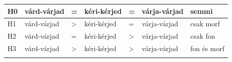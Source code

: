 \begin{frame}
{\def\LTcaptype{none} %
\begin{longtable}[]{@{}
  >{\raggedright\arraybackslash}p{}
  >{\raggedright\arraybackslash}p{}
  >{\raggedright\arraybackslash}p{}
  >{\raggedright\arraybackslash}p{}
  >{\raggedright\arraybackslash}p{}
  >{\raggedright\arraybackslash}p{}
  >{\raggedright\arraybackslash}p{}@{}}
\toprule\noalign{}
\begin{minipage}[b]{\linewidth}\raggedright
H0
\end{minipage} & \begin{minipage}[b]{\linewidth}\raggedright
várd-várjad
\end{minipage} & \begin{minipage}[b]{\linewidth}\raggedright
=
\end{minipage} & \begin{minipage}[b]{\linewidth}\raggedright
kéri-kérjed
\end{minipage} & \begin{minipage}[b]{\linewidth}\raggedright
=
\end{minipage} & \begin{minipage}[b]{\linewidth}\raggedright
várja-várjad
\end{minipage} & \begin{minipage}[b]{\linewidth}\raggedright
semmi
\end{minipage} \\
\midrule\noalign{}
\endhead
H1 & várd-várjad & \textgreater{} & kéri-kérjed & = & várja-várjad &
csak morf \\
H2 & várd-várjad & = & kéri-kérjed & \textgreater{} & várja-várjad &
csak fon \\
H3 & várd-várjad & \textgreater{} & kéri-kérjed & \textgreater{} &
várja-várjad & fon és morf \\
\bottomrule\noalign{}
\end{longtable}
}
\end{frame}

